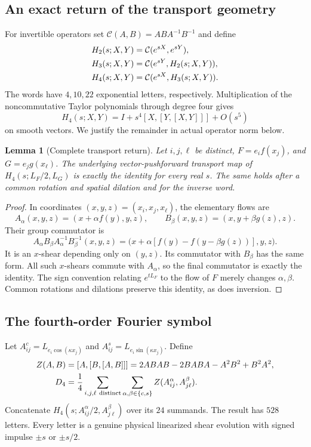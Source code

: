 \documentclass[11pt,a4paper]{amsart}
\newtheorem{lemma}[theorem]{Lemma}
\theoremstyle{definition}
\theoremstyle{remark}
\numberwithin{equation}{section}
\begin{document}
\subsection{An exact return of the transport geometry}

For invertible operators set $\mathcal C(A,B)=ABA^{-1}B^{-1}$ and define
\begin{align}
 H_2(s;X,Y)&=\mathcal C(e^{sX},e^{sY}),\notag\\
 H_3(s;X,Y)&=\mathcal C(e^{sY},H_2(s;X,Y)),\notag\\
 H_4(s;X,Y)&=\mathcal C(e^{sX},H_3(s;X,Y)).
 \label{fnd:words}
\end{align}
The words have $4,10,22$ exponential letters, respectively. Multiplication of
the noncommutative Taylor polynomials through degree four gives
\begin{equation}
 H_4(s;X,Y)=I+s^4[X,[Y,[X,Y]]]+O(s^5)
 \label{fnd:formal-word}
\end{equation}
on smooth vectors. We justify the remainder in actual operator norm below.

\begin{lemma}[Complete transport return]\label{fnd:transport-return}
Let $i,j,\ell$ be distinct, $F=e_i f(x_j)$, and $G=e_j g(x_\ell)$.
The underlying vector-pushforward transport map of
$H_4(s;L_F/2,L_G)$ is exactly the identity for every real $s$.
The same holds after a common rotation and spatial dilation and for the inverse
word.
\end{lemma}
\begin{proof}
In coordinates $(x,y,z)=(x_i,x_j,x_\ell)$, the elementary flows are
\[
 A_\alpha(x,y,z)=(x+\alpha f(y),y,z),\qquad
 B_\beta(x,y,z)=(x,y+\beta g(z),z).
\]
Their group commutator is
\[
 A_\alpha B_\beta A_\alpha^{-1}B_\beta^{-1}(x,y,z)
 =\bigl(x+\alpha[f(y)-f(y-\beta g(z))],y,z\bigr).
\]
It is an $x$-shear depending only on $(y,z)$. Its commutator with $B_\beta$ has
the same form. All such $x$-shears commute with $A_\alpha$, so the final
commutator is exactly the identity. The sign convention relating $e^{tL_F}$
to the flow of $F$ merely changes $\alpha,\beta$. Common rotations and dilations
preserve this identity, as does inversion.
\end{proof}

\subsection{The fourth-order Fourier symbol}

Let $A_{ij}^{c}=L_{e_i\cos(\kappa x_j)}$ and
$A_{ij}^{s}=L_{e_i\sin(\kappa x_j)}$. Define
\begin{align}
 Z(A,B)&=[A,[B,[A,B]]]=2ABAB-2BABA-A^2B^2+B^2A^2,\notag\\
 D_4&=\frac14\sum_{i,j,\ell\ {\rm distinct}}
       \sum_{\alpha,\beta\in\{c,s\}}
       Z(A_{ij}^{\alpha},A_{j\ell}^{\beta}).
 \label{fnd:D4}
\end{align}
Concatenate $H_4(s;A_{ij}^{\alpha}/2,A_{j\ell}^{\beta})$ over its $24$
summands. The result has $528$ letters. Every letter is a genuine physical
linearized shear evolution with signed impulse $\pm s$ or $\pm s/2$.
\end{document}
